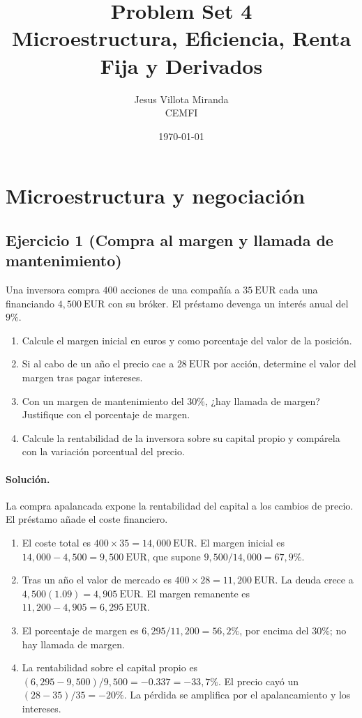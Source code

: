 \documentclass[12pt,a4paper]{article}
\title{\textbf{Problem Set 4}\\\large Microestructura, Eficiencia, Renta Fija y Derivados}
\author{Jesus Villota Miranda\\CEMFI}
\date{\today}
\newcommand{\EUR}[1]{\ensuremath{#1~\text{EUR}}}
\newenvironment{ejercicio}[1]{\subsection*{Ejercicio #1}}{}
\newenvironment{solucion}{\paragraph{Solución.}}{}
\begin{document}

 \section{Microestructura y negociación}

 \begin{ejercicio}{1 (Compra al margen y llamada de mantenimiento)}
 Una inversora compra \(400\) acciones de una compañía a \EUR{35} cada una financiando \EUR{4{,}500} con su bróker. El préstamo devenga un interés anual del \(9\%\).
 \begin{enumerate}[label=\alph*)]
   \item Calcule el margen inicial en euros y como porcentaje del valor de la posición.
   \item Si al cabo de un año el precio cae a \EUR{28} por acción, determine el valor del margen tras pagar intereses.
   \item Con un margen de mantenimiento del \(30\%\), ¿hay llamada de margen? Justifique con el porcentaje de margen.
   \item Calcule la rentabilidad de la inversora sobre su capital propio y compárela con la variación porcentual del precio.
 \end{enumerate}
 \end{ejercicio}
 \begin{solucion}
 La compra apalancada expone la rentabilidad del capital a los cambios de precio. El préstamo añade el coste financiero.
 \begin{enumerate}[label=\alph*)]
   \item El coste total es \(400\times 35 = \EUR{14{,}000}\). El margen inicial es \(14{,}000-4{,}500 = \EUR{9{,}500}\), que supone \(9{,}500/14{,}000 = 67{,}9\%\).
   \item Tras un año el valor de mercado es \(400\times 28 = \EUR{11{,}200}\). La deuda crece a \(4{,}500(1.09)=\EUR{4{,}905}\). El margen remanente es \(11{,}200-4{,}905 = \EUR{6{,}295}\).
   \item El porcentaje de margen es \(6{,}295/11{,}200 = 56{,}2\%\), por encima del \(30\%\); no hay llamada de margen.
   \item La rentabilidad sobre el capital propio es \((6{,}295-9{,}500)/9{,}500 = -0.337 = -33{,}7\%\). El precio cayó un \( (28-35)/35 = -20\% \). La pérdida se amplifica por el apalancamiento y los intereses.
 \end{enumerate}
 \end{solucion}
\end{document}
